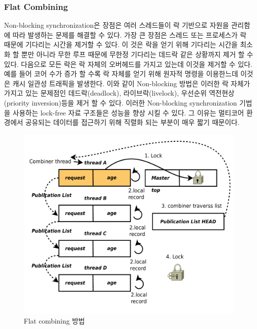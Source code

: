 \subsubsection{Flat Combining}


Non-blocking synchronization은 장점은 여러 스레드들이 락 기반으로 자원을 관리함에 따라
 발생하는 문제를 해결할 수 있다. 
가장 큰 장점은 스레드 또는 프로세스가 락 때문에 기다리는 시간을 제거할 수 있다.
이 것은 락을 얻기 위해 기다리는 시간을 최소화 할 뿐만 아니라 무한 루프 때문에 무한정 기다리는 
데드락 같은 상황까지 제거 할 수 있다. 
다음으로 모든 락은 락 자체의 오버헤드를 가지고 있는데 이것을 제거할 수 있다. 
예를 들어 코어 수가 증가 할 수록 락 자체를 얻기 위해 원자적 명령을 이용한느데 이것은 캐시 일관성 트래픽을 
발생한다. 
이와 같이 Non-blocking 방법은 이러한 락 자체가 가지고 있는 문제점인 데드락(deadlock), 라이브락(livelock), 
우선순위 역전현상(priority inversion)등을 제거 할 수 있다. 
이러한 Non-blocking synchronization 기법을 사용하는 lock-free 자료 구조들은 성능을 향상 시킬 수 있다. 
그 이유는 멀티코어 환경에서 공유되는 데이터를 접근하기 위해 직렬화 되는 부분이 매우 짧기 때문이다. 

\begin{figure}[h!]
    \centering
    \includegraphics[width=1\textwidth]{fig/FC/FC}
    \caption{Flat combining 방법}
  \label{fig:FC}
\end{figure}

